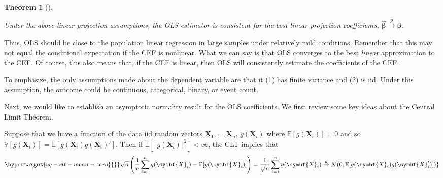 \documentclass[
  letterpaper,
  DIV=11,
  numbers=noendperiod]{scrreprt}
\newcommand{\mb}{\symbf}
\newcommand{\E}{\mathbb{E}}
\newcommand{\V}{\mathbb{V}}
\newcommand{\N}{\mathcal{N}}
\newcommand{\X}{\mb{X}}
\newcommand{\bfbeta}{\mb{\beta}}
\newcommand{\bhat}{\widehat{\mb{\beta}}}
\newcommand{\inprob}{\overset{p}{\to}}
\newcommand{\indist}{\overset{d}{\to}}
\theoremstyle{plain}
\newtheorem{theorem}{Theorem}[chapter]
\theoremstyle{definition}
\theoremstyle{definition}
\theoremstyle{remark}
\begin{document}
\begin{theorem}[]\protect\hypertarget{thm-ols-consistency}{}\label{thm-ols-consistency}

Under the above linear projection assumptions, the OLS estimator is
consistent for the best linear projection coefficients,
\(\bhat \inprob \bfbeta\).

\end{theorem}

Thus, OLS should be close to the population linear regression in large
samples under relatively mild conditions. Remember that this may not
equal the conditional expectation if the CEF is nonlinear. What we can
say is that OLS converges to the best \emph{linear} approximation to the
CEF. Of course, this also means that, if the CEF is linear, then OLS
will consistently estimate the coefficients of the CEF.

To emphasize, the only assumptions made about the dependent variable are
that it (1) has finite variance and (2) is iid. Under this assumption,
the outcome could be continuous, categorical, binary, or event count.

Next, we would like to establish an asymptotic normality result for the
OLS coefficients. We first review some key ideas about the Central Limit
Theorem.

\begin{tcolorbox}[enhanced jigsaw, opacityback=0, breakable, bottomtitle=1mm, opacitybacktitle=0.6, coltitle=black, leftrule=.75mm, toptitle=1mm, colback=white, titlerule=0mm, colframe=quarto-callout-note-color-frame, rightrule=.15mm, bottomrule=.15mm, toprule=.15mm, title=\textcolor{quarto-callout-note-color}{\faInfo}\hspace{0.5em}{CLT reminder}, left=2mm, arc=.35mm, colbacktitle=quarto-callout-note-color!10!white]

Suppose that we have a function of the data iid random vectors
\(\X_1, \ldots, \X_n\), \(g(\X_{i})\) where \(\E[g(\X_{i})] = 0\) and so
\(\V[g(\X_{i})] = \E[g(\X_{i})g(\X_{i})']\). Then if
\(\E[\Vert g(\X_{i})\Vert^{2}] < \infty\), the CLT implies that
\begin{equation}\protect\hypertarget{eq-clt-mean-zero}{}{ 
\sqrt{n}\left(\frac{1}{n} \sum_{i=1}^{n} g(\X_{i}) - \E[g(\X_{i})]\right) = \frac{1}{\sqrt{n}} \sum_{i=1}^{n} g(\X_{i}) \indist \N(0, \E[g(\X_{i})g(\X_{i}')]) 
}\label{eq-clt-mean-zero}\end{equation}

\end{tcolorbox}
\end{document}

